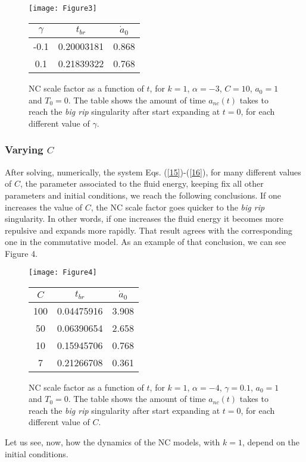 \documentclass[12pt]{article}
\newcommand{\0}{{(0)}}
\newcommand{\1}{{(1)}}
\newcommand{\2}{{(2)}}
\begin{document}
{\begin{figure}[!htb]
	\centering
	\begin{minipage}[c]{0.49\linewidth}
		\centering
		\texttt{[image: Figure3]}
	\end{minipage}
	\hfill
	\begin{minipage}[c]{0.49\linewidth}
		\centering
		\begin{tabular}{ccc}\hline
			$\gamma$ & $t_{br}$ & $\dot{a}_0$ \\ \hline
			-0.1 &  0.20003181 & 0.868 \\
			0.1 & 0.21839322 & 0.768  \\ \hline
		\end{tabular}
	\end{minipage}
	\caption{NC scale factor as a function of $t$, for $k = 1$, $\alpha = -3$, $C = 10$, $a_0 = 1$ and $T_0 = 0$.
	The table shows the amount of time $a_{nc}(t)$ takes to reach the {\it big rip} singularity after start expanding at $t=0$, 
		for each different value of $\gamma$.}\label{fig3}
\end{figure}

\subsubsection{Varying $C$}

After solving, numerically, the system Eqs. (\ref{15})-(\ref{16}), for many different values of $C$, the parameter associated to 
the fluid energy, keeping fix all other parameters and initial conditions, we reach the following conclusions. If one increases 
the value of $C$, the NC scale factor goes quicker to the {\it big rip} singularity. In other words, if one increases the fluid
energy it becomes more repulsive and expands more rapidly. That result agrees with the corresponding one in the commutative model. 
As an example of that conclusion, we can see Figure 4.

\begin{figure}[!htb]
	\centering
	\begin{minipage}[c]{0.49\linewidth}
		\centering
		\texttt{[image: Figure4]}
	\end{minipage}
	\hfill
	\begin{minipage}[c]{0.49\linewidth}
		\centering
		\begin{tabular}{ccc}\hline
			$C$ & $t_{br}$ & $\dot{a}_0$ \\ \hline
			100 & 0.04475916 & 3.908 \\
			50 & 0.06390654 & 2.658 \\
			10 & 0.15945706 & 0.768\\
			7 &  0.21266708 & 0.361 \\ \hline
		\end{tabular}
	\end{minipage}
	\caption{NC scale factor as a function of $t$, for $k = 1$, $\alpha = -4$, $\gamma = 0.1$, $a_0 = 1$ and $T_0 = 0$.
	The table shows the amount of time $a_{nc}(t)$ takes to reach the {\it big rip} singularity after start expanding at $t=0$, 
		for each different value of $C$.}\label{fig4}
\end{figure}
Let us see, now, how the dynamics of the NC models, with $k = 1$, depend on the initial conditions.

}
\end{document}
